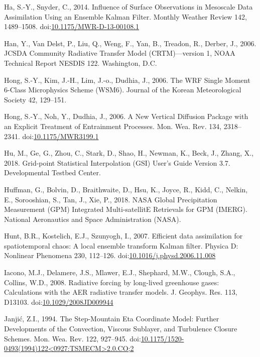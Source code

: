 \documentclass[final,5p,times,twocolumn,authoryear]{elsarticle} %
\begin{document}
\leavevmode\hypertarget{ref-ha2014}{}%
Ha, S.-Y., Snyder, C., 2014. Influence of Surface Observations in Mesoscale Data Assimilation Using an Ensemble Kalman Filter. Monthly Weather Review 142, 1489--1508. doi:\href{https://doi.org/10.1175/MWR-D-13-00108.1}{10.1175/MWR-D-13-00108.1}

\leavevmode\hypertarget{ref-han2006}{}%
Han, Y., Van Delst, P., Liu, Q., Weng, F., Yan, B., Treadon, R., Derber, J., 2006. JCSDA Community Radiative Transfer Model (CRTM)---version 1, NOAA Technical Report NESDIS 122. Washington, D.C.

\leavevmode\hypertarget{ref-hong2006a}{}%
Hong, S.-Y., Kim, J.-H., Lim, J.-o., Dudhia, J., 2006. The WRF Single Moment 6-Class Microphysics Scheme (WSM6). Journal of the Korean Meteorological Society 42, 129--151.

\leavevmode\hypertarget{ref-hong2006}{}%
Hong, S.-Y., Noh, Y., Dudhia, J., 2006. A New Vertical Diffusion Package with an Explicit Treatment of Entrainment Processes. Mon. Wea. Rev. 134, 2318--2341. doi:\href{https://doi.org/10.1175/MWR3199.1}{10.1175/MWR3199.1}

\leavevmode\hypertarget{ref-hu2018}{}%
Hu, M., Ge, G., Zhou, C., Stark, D., Shao, H., Newman, K., Beck, J., Zhang, X., 2018. Grid-point Statistical Interpolation (GSI) User's Guide Version 3.7. Developmental Testbed Center.

\leavevmode\hypertarget{ref-huffman2018}{}%
Huffman, G., Bolvin, D., Braithwaite, D., Hsu, K., Joyce, R., Kidd, C., Nelkin, E., Sorooshian, S., Tan, J., Xie, P., 2018. NASA Global Precipitation Measurement (GPM) Integrated Multi-satellitE Retrievals for GPM (IMERG). National Aeronautics and Space Administration (NASA).

\leavevmode\hypertarget{ref-hunt2007}{}%
Hunt, B.R., Kostelich, E.J., Szunyogh, I., 2007. Efficient data assimilation for spatiotemporal chaos: A local ensemble transform Kalman filter. Physica D: Nonlinear Phenomena 230, 112--126. doi:\href{https://doi.org/10.1016/j.physd.2006.11.008}{10.1016/j.physd.2006.11.008}

\leavevmode\hypertarget{ref-iacono2008}{}%
Iacono, M.J., Delamere, J.S., Mlawer, E.J., Shephard, M.W., Clough, S.A., Collins, W.D., 2008. Radiative forcing by long-lived greenhouse gases: Calculations with the AER radiative transfer models. J. Geophys. Res. 113, D13103. doi:\href{https://doi.org/10.1029/2008JD009944}{10.1029/2008JD009944}

\leavevmode\hypertarget{ref-janjic1994}{}%
Janjić, Z.I., 1994. The Step-Mountain Eta Coordinate Model: Further Developments of the Convection, Viscous Sublayer, and Turbulence Closure Schemes. Mon. Wea. Rev. 122, 927--945. doi:\href{https://doi.org/10.1175/1520-0493(1994)122\%3C0927:TSMECM\%3E2.0.CO;2}{10.1175/1520-0493(1994)122\textless0927:TSMECM\textgreater2.0.CO;2}
\end{document}
